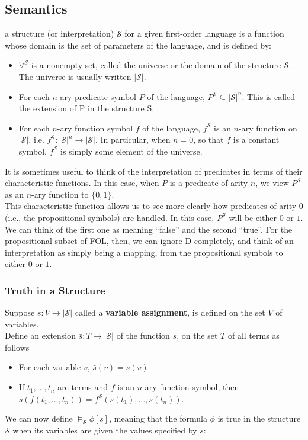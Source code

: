 \documentclass{article}
\begin{document}
\subsection{Semantics}
a structure (or interpretation) $\mathcal{S}$ for a given first-order language is a function whose domain is the set of parameters of the language, and is defined by:
\begin{itemize}
 \item $\forall^{\mathcal{S}}$ is a nonempty set, called the universe or the domain of the structure $\mathcal{S}$. The universe is usually written $|\mathcal{S}|$.
 \item For each $n$-ary predicate symbol $P$ of the language, $P^{\mathcal{S}} \subseteq |\mathcal{S}|^n$. This is called the extension of P in the structure S.
 \item For each $n$-ary function symbol $f$ of the language, $f^{\mathcal{S}}$ is an $n$-ary function on $|\mathcal{S}|$, i.e. \mbox{$f^\mathcal{S}:|\mathcal{S}|^n \rightarrow |\mathcal{S}|$}. In particular,
 when $n = 0$, so that $f$ is a constant symbol, $f^\mathcal{S}$ is simply some element of the universe.
\end{itemize}
It is sometimes useful to think of the interpretation of predicates in terms of their characteristic functions. In this case, when $P$ is a predicate
of arity $n$, we view $P^{\mathcal{S}}$ as an $n$-ary function to $\{0, 1\}$.\\
This characteristic function allows us to see more clearly how predicates of arity $0$ (i.e., the propositional
symbols) are handled. In this case, $P^\mathcal{S}$ will be either $0$ or $1$. We can think of the first one as meaning ``false'' and the second ``true''.
For the propositional subset of FOL, then, we can ignore D completely, and think of an interpretation as simply being a mapping, from the propositional symbols to either $0$ or $1$.

\subsubsection*{Truth in a Structure}

Suppose $s:V\rightarrow |\mathcal{S}|$ called a \textbf{variable assignment}, is defined on the set $V$ of variables.\\
Define an extension $\bar{s}:T\rightarrow |\mathcal{S}|$ of the function $s$, on the set $T$ of all terms as follows
\begin{itemize}
 \item For each variable $v$, $\bar{s}(v)=s(v)$
 \item If $t_1,\ldots,t_n$ are terms and $f$ is an $n$-ary function symbol, then\\
       $\bar{s}(f(t_1,\ldots,t_n))=f^{\mathcal{S}}(\bar{s}(t_1),\ldots,\bar{s}(t_n))$.
\end{itemize}
We can now define $\vDash_\mathcal{S} \phi[s]$, meaning that the formula $\phi$ is true in the structure $\mathcal{S}$ when its variables are given the values specified by $s$:\\
\end{document}
